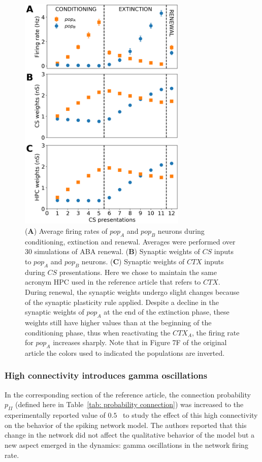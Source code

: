 \begin{figure}[!ht]
\centering
\includegraphics[width=8cm]{figures/RENEWAL_avarages.png}
\caption{\label{fig:weights_RENEWAL} (\textbf{A}) Average firing rates of $pop_A$ and $pop_B$ neurons during conditioning, extinction and renewal. Averages were performed over 30 simulations of ABA renewal. (\textbf{B}) Synaptic weights of $CS$ inputs to $pop_A$ and $pop_B$ neurons. (\textbf{C}) Synaptic weights of $CTX$ inputs during $CS$ presentations. Here we chose to maintain the same acronym HPC used in the reference article that refers to $CTX$. During renewal, the synaptic weights undergo slight changes because of the synaptic plasticity rule applied. Despite a decline in the synaptic weights of $pop_A$ at the end of the extinction phase, these weights still have higher values than at the beginning of the conditioning phase, thus when reactivating the $CTX_A$, the firing rate for $pop_A$ increases sharply. Note that in Figure 7F of the original article the colors used to indicated the populations are inverted.}
\end{figure}
\FloatBarrier

\subsubsection*{High connectivity introduces gamma oscillations}

In the corresponding section of the reference article, the connection probability $p_{II}$ (defined here in Table~\ref{tab: probability connection}) was increased to the experimentally reported value of $0.5$~\cite{woodruff2007networks} to study the effect of this high connectivity on the behavior of the spiking network model. The authors reported that this change in the network did not affect the qualitative behavior of the model but a new aspect emerged in the dynamics: gamma oscillations in the network firing rate.

